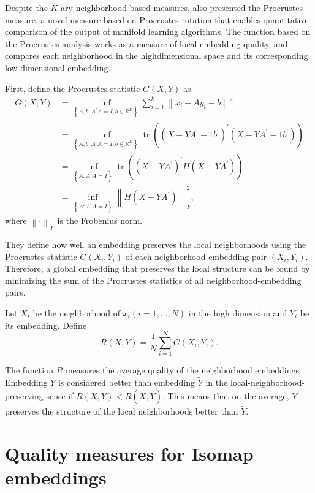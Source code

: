 \documentclass[11pt,a4paper,]{article}
\begin{document}
Despite the \(K\)-ary neighborhood based measures, \textcite{Goldberg2009-tb} also presented the Procrustes measure, a novel measure based on Procrustes rotation that enables quantitative comparison of the output of manifold learning algorithms. The function based on the Procrustes analysis works as a measure of local embedding quality, and compares each neighborhood in the highdimensional space and its corresponding low-dimensional embedding.

First, define the Procrustes statistic \(G(X, Y)\) as
\[
\begin{aligned}
G(X, Y) &= \inf _{\left\{A, b: A^{\prime} A=I, b \in \mathbb{R}^{D}\right\}} \sum_{i=1}^{k}\left\|x_{i}-A y_{i}-b\right\|^{2} \\
&= \inf _{\left\{A, b: A^{\prime} A=I, b \in \mathbb{R}^{D}\right\}} \operatorname{tr}\left(\left(X-Y A^{\prime}-1 b^{\prime}\right)^{\prime}\left(X-Y A^{\prime}-1 b^{\prime}\right)\right) \\
&= \inf _{\left\{A: A^{\prime} A=I\right\}} \operatorname{tr}\left(\left(X-Y A^{\prime}\right)^{\prime} H\left(X-Y A^{\prime}\right)\right) \\
&= \inf _{\left\{A: A^{\prime} A=I\right\}}\left\|H\left(X-Y A^{\prime}\right)\right\|_{F}^{2},
\end{aligned}
\]
where \(\left\| \cdot \right\|_{F}\) is the Frobenius norm.

They define how well an embedding preserves the local neighborhoods using the Procrustes statistic \(G(X_i,Y_i)\) of each neighborhood-embedding pair \((X_i,Y_i)\). Therefore, a global embedding that preserves
the local structure can be found by minimizing the sum of the Procrustes statistics of all neighborhood-embedding pairs.

Let \(X_{i}\) be the neighborhood of \(x_{i}(i=1, \ldots, N)\) in the high dimension and \(Y_{i}\) be its embedding. Define
\begin{equation}
\label{procrustes}
R(X, Y)=\frac{1}{N} \sum_{i=1}^{N} G \left(X_{i}, Y_{i}\right).
\end{equation}

The function \(R\) measures the average quality of the neighborhood embeddings. Embedding \(Y\) is considered better than embedding \(\tilde{Y}\) in the local-neighborhood-preserving sense if \(R(X, Y) < R(X, \tilde{Y})\). This means that on the average, \(Y\) preserves the structure of the local neighborhoods better than \(\tilde{Y}\).

\hypertarget{quality-measures-for-isomap-embeddings}{%
\section{Quality measures for Isomap embeddings}\label{quality-measures-for-isomap-embeddings}}
\end{document}
